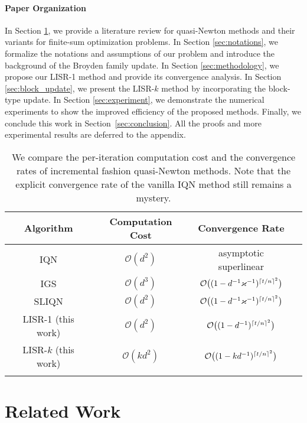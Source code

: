\documentclass[letterpaper]{article} %
\theoremstyle{plain}
\theoremstyle{definition}
\theoremstyle{remark}
\DeclarePairedDelimiter\ceil{\lceil}{\rceil}
\def\fO{{\mathcal{O}}}
\begin{document}
\paragraph{Paper Organization} 
In Section \ref{sec:related_works}, we provide a literature review for quasi-Newton methods and their variants for finite-sum optimization problems.
In Section \ref{sec:notations}, we formalize the notations and assumptions of our problem and introduce the background of the Broyden family update. 
In Section \ref{sec:methodology}, we propose our LISR-1 method and provide its convergence analysis. 
In Section \ref{sec:block_update}, we present the LISR-$k$ method by incorporating the block-type update.
In Section \ref{sec:experiment}, we demonstrate the numerical experiments to show the improved efficiency of the proposed methods. 
Finally, we conclude this work in Section~\ref{sec:conclusion}.
All the proofs and more experimental results are deferred to the appendix.

\begin{table*}[t]
\centering
\begin{tabular}{cccc}
    \toprule
    Algorithm & Computation Cost & Convergence Rate \\
    \midrule
    IQN \cite{mokhtari2018iqn}  & $\fO(d^2)$ & asymptotic superlinear  \\\addlinespace
    IGS \cite{gao2020incremental} &  $\fO(d^3)$ & $\fO\big((1-d^{-1} \varkappa^{-1})^{\ceil{t/n}^2}\big)$  \\\addlinespace
    SLIQN \cite{lahoti2023sharpened}  & $\fO(d^2)$ & $\fO\big((1-d^{-1} \varkappa^{-1})^{\ceil{t/n}^2}\big)$  \\\addlinespace 
    \hline \addlinespace
     LISR-1 (this work) & $\fO(d^2)$ & $\fO\big((1-d^{-1})^{\ceil{t/n}^2}\big)$  \\\addlinespace
     LISR-$k$ (this work) & $\fO(k d^2)$ & $\fO\big((1- k d^{-1} )^{\ceil{t/n}^2}\big)$  \\\addlinespace
    \bottomrule
\end{tabular}
\caption{We compare the per-iteration computation cost and the convergence rates of incremental fashion quasi-Newton methods. Note that the explicit convergence rate of the vanilla IQN method still remains a mystery.}
\label{tab:theoretic_res}
\end{table*}

\section{Related Work}\label{sec:related_works} 
\end{document}

